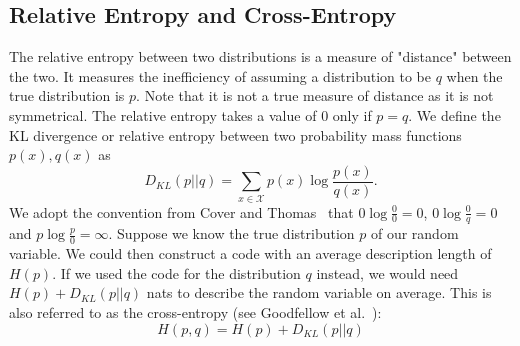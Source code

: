 \subsection{Relative Entropy and Cross-Entropy}
The relative entropy between two distributions is a measure of "distance" between the two. It measures the inefficiency of assuming a distribution to be $q$ when the true distribution is $p$. Note that it is not a true measure of distance as it is not symmetrical. The relative entropy takes a value of $0$ only if $p = q$.
We define the KL divergence or relative entropy between two probability mass functions $p(x), q(x)$ as
\begin{equation}
    D_{KL}(p||q) = \sum_{x \in \mathcal{X}} p(x)\log \frac{p(x)}{q(x)}.
\end{equation}
We adopt the convention from Cover and Thomas~\cite{Cover2005} that $0 \log \frac{0}{0} = 0$, $0 \log \frac{0}{q} = 0$ and $p \log \frac{p}{0} = \infty$.
Suppose we know the true distribution $p$ of our random variable. We could then construct a code with an average description length of $H(p)$. If we used the code for the distribution $q$ instead, we would need $H(p) + D_{KL}(p||q)$ nats to describe the random variable on average. This is also referred to as the cross-entropy (see Goodfellow et al.~\cite{Goodfellow-et-al-2016}):
\begin{equation}
    H(p,q) =  H(p) + D_{KL}(p||q)
\end{equation}



